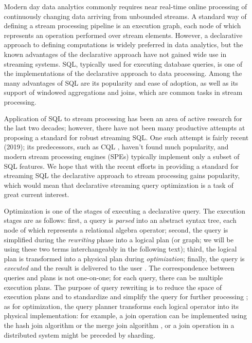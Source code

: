 \label {fs-optimization-introduction}

Modern day data analytics commonly requires near real-time online processing of continuously changing data arriving from unbounded streams. A standard way of defining a stream processing pipeline is an execution graph, each node of which represents an operation performed over stream elements. However, a declarative approach to defining computations is widely preferred in data analytics, but the known advantages of the declarative approach have not gained wide use in streaming systems. SQL, typically used for executing database queries, is one of the implementations of the declarative approach to data processing. Among the many advantages of SQL are its popularity and ease of adoption, as well as its support of windowed aggregations and joins, which are common tasks in stream processing. 

Application of SQL to stream processing has been an area of active research for the last two decades; however, there have not been many productive attempts at proposing a standard for robust streaming SQL. One such attempt \cite{Begoli:2019:OSR:3299869.3314040} is fairly recent (2019); its predecessors, such as CQL \cite{Arasu:2006:CCQ:1146461.1146463}, haven't found much popularity, and modern stream processing engines (SPEs) typically implement only a subset of SQL features. We hope that with the recent efforts in providing a standard for streaming SQL the declarative approach to stream processing gains popularity, which would mean that declarative streaming query optimization is a task of great current interest.

Optimization is one of the stages of executing a declarative query. The execution stages are as follows: first, a query is \textit{parsed} into an abstract syntax tree, each node of which represents a relational algebra operator; second, the query is simplified during the \textit{rewriting} phase into a logical plan (or graph; we will be using these two terms interchangeably in the following text); third, the logical plan is transformed into a physical plan during \textit{optimization}; finally, the query is \textit{executed} and the result is delivered to the user \cite{Pitoura2018processing}. The correspondence between queries and plans is not one-on-one; for each query, there can be multiple execution plans. The purpose of query rewriting is to reduce the space of execution plans and to standardize and simplify the query for further processing \cite{Pitoura2018rewriting}; as for optimization, the query planner transforms each logical operator into its physical implementation: for example, a join operation can be implemented using the hash join algorithm or the merge join algorithm \cite{Neumann2018optimization}, or a join operation in a distributed system might be preceded by sharding.  

